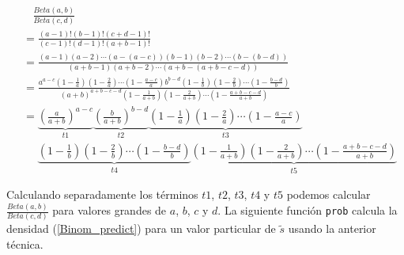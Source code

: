     \begin{align*}
    &\ \ \ \ \frac{Beta(a,b)}{Beta(c,d)}\\
    &=\frac{(a-1)!(b-1)!(c+d-1)!}{(c-1)!(d-1)!(a+b-1)!}\\
    &=\frac{(a-1)(a-2)\cdots(a-(a-c))(b-1)(b-2)\cdots(b-(b-d))}{(a+b-1)(a+b-2)\cdots(a+b-(a+b-c-d))}\\
    &=\frac{a^{a-c}(1-\frac{1}{a})(1-\frac{2}{a})\cdots(1-\frac{a-c}{a})b^{b-d}(1-\frac{1}{b})(1-\frac{2}{b})\cdots(1-\frac{b-d}{b})}{(a+b)^{a+b-c-d}(1-\frac{1}{a+b})(1-\frac{2}{a+b})\cdots(1-\frac{a+b-c-d}{a+b})}\\
    &=\underbrace{\left(\frac{a}{a+b}\right)^{a-c}}_{t1}\underbrace{\left(\frac{b}{a+b}\right)^{b-d}}_{t2}\underbrace{(1-\frac{1}{a})(1-\frac{2}{a})\cdots(1-\frac{a-c}{a})}_{t3}\\
    &\ \ \ \ \ \ \underbrace{(1-\frac{1}{b})(1-\frac{2}{b})\cdots(1-\frac{b-d}{b})}_{t4}\underbrace{(1-\frac{1}{a+b})(1-\frac{2}{a+b})\cdots(1-\frac{a+b-c-d}{a+b})}_{t5}
    \end{align*}
    
    Calculando separadamente los t\'erminos $t1$, $t2$, $t3$, $t4$ y $t5$ podemos calcular $\frac{Beta(a,b)}{Beta(c,d)}$ para valores grandes de $a$, $b$, $c$ y $d$. La siguiente funci\'on \verb"prob" calcula la densidad (\ref{Binom_predict}) para un valor particular de $\tilde{s}$ usando la anterior t\'ecnica.
    
